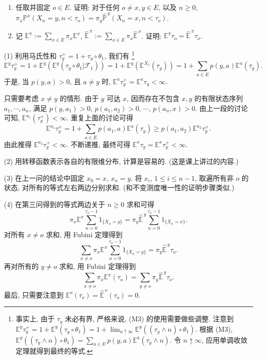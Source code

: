 \begin{enumerate}
\begin{enumerate}[label=(\arabic*)]
        \item 任取并固定 $o\in E$. 证明: 对于任何 $o\neq x,y\in E$, 以及 $n\geq 0$,
        $\pi_x\mathbb P^x(X_n=y,n<\tau_o)=
        \pi_y\widehat{\mathbb P}^{\,y}(X_n=x,n<\tau_o)$.

        \item 记 $\mathbb E^\pi:=\sum_{x\in E}\pi_x\mathbb E^x$,
        $\widehat{\mathbb E}^{\,\pi}:=\sum_{x\in E}\pi_x\widehat{\mathbb E}^{\,x}$.
        证明: $\mathbb E^\pi\tau_o=\widehat{\mathbb E}^{\,\pi}\tau_o$.
    \end{enumerate}

    \begin{proofc}[证明]
        (1) 利用马氏性和 $\tau_y^+=1+\tau_y\circ\theta_1$, 我们有
        \footnote{事实上, 由于 $\tau_y$ 未必有界, 严格来说, (M3) 的使用需要做些调整. 注意到
        $\mathbb E^y\tau_y^+=1+\mathbb E^y(\tau_y\circ\theta_1)
        =1+\lim_{n\uparrow\infty}\mathbb E^y((\tau_y\wedge n)\circ\theta_1)$.
        根据 (M3), $\mathbb E^y((\tau_y\wedge n)\circ\theta_1)
        =\sum_{a\in E}p(y,a)\mathbb E^a(\tau_y\wedge n)$. 令 $n\uparrow\infty$,
        应用单调收敛定理就得到最终的等式.}
        \[
            \mathbb E^y\tau_y^+
            =1+\mathbb E^y(\mathbb E^y(\tau_y\circ\theta_1|\mathscr F_1))
            =1+\mathbb E^y(\mathbb E^{X_1}(\tau_y))
            =1+\sum_{a\in E}p(y,a)\mathbb E^a(\tau_y).
        \]
        于是, 当 $p(y,a)>0$, 且 $a\neq y$ 时, $\mathbb E^a\tau_y^+=\mathbb E^a\tau_y<\infty$.

        只需要考虑 $x\neq y$ 的情形. 由于 $y$ 可达 $x$, 因而存在不包含 $x,y$ 的有限状态序列
        $a_1,\cdots,a_n$, 满足 $p(y,a_1)>0$, $p(a_1,a_2)>0$, $\cdots$, $p(a_n,x)>0$.
        由上一段的讨论可知, $\mathbb E^{a_1}(\tau_y^+)<\infty$. 重复上面的讨论可得
        \[
            \mathbb E^{a_1}\tau_y^+
            =1+\sum_{a\in E}p(a_1,a)\mathbb E^a(\tau_y)
            \geq p(a_1,a_2)\mathbb E^{a_2}\tau_y^+.
        \]
        由此推得 $\mathbb E^{a_2}\tau_y^+<\infty$. 不断递推, 最终可得
        $\mathbb E^x\tau_y=\mathbb E^x\tau_y^+<\infty$.

        (2) 用转移函数表示各自的有限维分布, 计算是容易的. (这是课上讲过的内容.)

        (3) 在上一问的结论中固定 $x_0=x$, $x_n=y$. 将 $x_i$, $1\leq i\leq n-1$,
        取遍所有非 $o$ 的状态, 对所有的等式左右两边分别求和. (和不变测度唯一性的证明步骤类似.)

        (4) 在第三问得到的等式两边关于 $n\geq 0$ 求和可得
        \[
            \pi_x\mathbb E^x\sum_{n=0}^{\tau_o-1}1_{\{X_n=y\}}
            =
            \pi_y\widehat{\mathbb E}^{\,y}\sum_{n=0}^{\tau_o-1}1_{\{X_n=x\}}.
        \]
        对所有 $x\neq o$ 求和, 用 Fubini 定理得到
        \[
            \sum_{x\neq o}\pi_x\mathbb E^x\sum_{n=0}^{\tau_o-1}1_{\{X_n=y\}}
            =
            \pi_y\widehat{\mathbb E}^{\,y}\tau_o.
        \]
        再对所有的 $y\neq o$ 求和, 用 Fubini 定理得到
        \[
            \sum_{x\neq o}\pi_x\mathbb E^x(\tau_o)
            =
            \sum_{y\neq o}\pi_y\widehat{\mathbb E}^{\,y}\tau_o.
        \]
        最后, 只需要注意到 $\mathbb E^o(\tau_o)=\widehat{\mathbb E}^{\,o}(\tau_o)=0$.
    

\end{proofc}
\end{enumerate}
